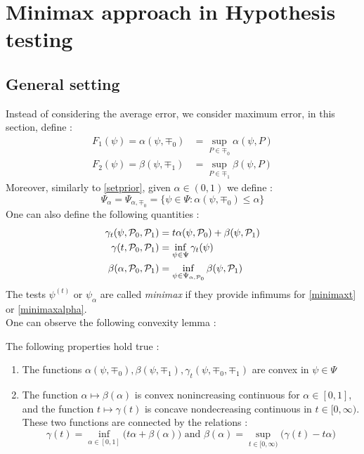 \section{Minimax approach in Hypothesis testing}\label{sec:minimax}
\subsection{General setting}
Instead of considering the average error, we consider maximum error, in this section, define : 
\begin{align}
    F_1(\psi) = \alpha(\psi,\mp_0) &= \sup_{P\in\mp_0}\alpha(\psi,P) \\
    F_2(\psi) = \beta(\psi,\mp_1) &= \sup_{P\in\mp_1}\beta(\psi,P)
\end{align}
Moreover, similarly to \cref{setprior}, given $\alpha \in \left(0,1\right)$ we define : 
\begin{equation}
    \Psi_\alpha = \Psi_{\alpha,\mp_0} = \bigl\{\psi \in \Psi : \alpha(\psi,\mp_0) \leq \alpha \bigr\}
\end{equation}
One can also define the following quantities : 
\begin{align}
    \gamma_t(\psi,\mp_0,\mp_1) &= t\alpha(\psi,\mp_0) + \beta(\psi,\mp_1) \notag \\
    \gamma(t,\mp_0,\mp_1) &= \inf_{\psi \in \Psi} \gamma_t(\psi) \label{minimaxt} \\
    \beta(\alpha,\mp_0,\mp_1)&= \inf_{\psi\in \Psi_{\alpha,\mp_0}} \beta(\psi,\mp_1)  \label{minimaxalpha}
\end{align}
The tests $\psi^{(t)}$ or $\psi_\alpha$ are called \textit{minimax} if they provide infimums for \cref{minimaxt} or \cref{minimaxalpha}. \\ 

One can observe the following convexity lemma : 
\begin{lemma}\label{conv}\citet[Lemma 2.3]{Ing2012}
    The following properties hold true : 
    \begin{enumerate}
        \item The functions $\alpha(\psi,\mp_0),\beta(\psi,\mp_1),\gamma_t(\psi,\mp_0,\mp_1)$ are convex in $\psi\in\Psi$
        \item The function $\alpha \mapsto \beta(\alpha)$ is convex nonincreasing continuous for $\alpha \in [0,1]$, and the function $t\mapsto \gamma(t)$ is concave nondecreasing continuous in $t \in [0,\infty )$. These two functions are connected by the relations : 
        \begin{equation}\label{gammabetarelation}
            \gamma(t) = \inf_{\alpha \in [0,1]} \big(t\alpha + \beta(\alpha)\big) \text{ and } \beta(\alpha) = \sup_{t \in [0,\infty)} \big(\gamma(t) - t\alpha\big)
        \end{equation}
    \end{enumerate}
\end{lemma}

